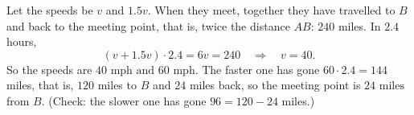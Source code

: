 Let the speeds be $v$ and $1.5v$. When they meet, together they have travelled to $B$ and back to the meeting point, that is, twice the distance $AB$: $240$ miles. In $2.4$ hours,
\[
(v+1.5v)\cdot2.4=6v=240\quad\Longrightarrow\quad v=40 .
\]
So the speeds are $\boxed{40\text{ mph and }60\text{ mph}}$. The faster one has gone $60\cdot2.4=144$ miles, that is, $120$ miles to $B$ and $24$ miles back, so the meeting point is $\boxed{24\text{ miles}}$ from $B$. (Check: the slower one has gone $96=120-24$ miles.)
